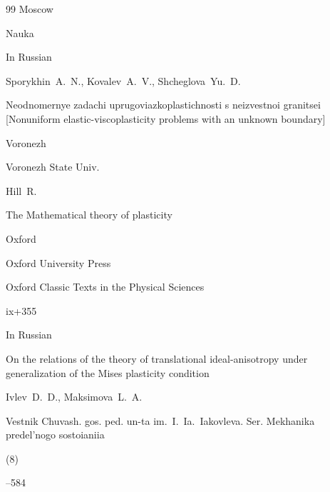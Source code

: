 \begin{thebibliography}{99}
\publaddr Moscow

\publ Nauka








\lang In Russian

\by Sporykhin~A.~N., Kovalev~A.~V., Shcheglova~Yu.~D.

\book Neodnomernye zadachi uprugoviazkoplastichnosti s neizvestnoi granitsei \rm [Nonuniform  elastic-viscoplasticity problems  with an unknown boundary]

\publaddr Voronezh

\publ Voronezh State Univ.












\by Hill~R.

\book The Mathematical theory of plasticity

\publaddr Oxford

\publ Oxford University Press

\serial Oxford Classic Texts in the Physical Sciences


\totalpages ix+355







\lang In Russian

\paper On the relations of the theory of translational ideal-anisotropy under generalization of the Mises plasticity condition

\by Ivlev~D.~D., Maksimova~L.~A.

\jour Vestnik Chuvash. gos. ped. un-ta im.~I.~Ia.~Iakovleva. Ser. Mekhanika predel'nogo sostoianiia


(8)

--584







\end{thebibliography}
